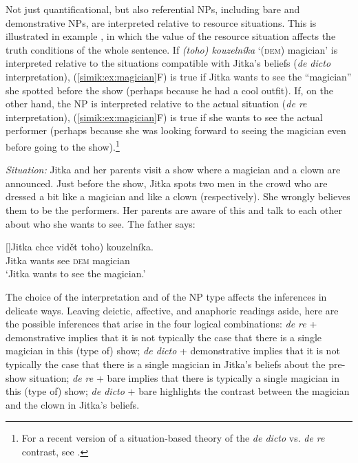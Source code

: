 \documentclass[output=paper,colorlinks,citecolor=brown,newtxmath]{langscibook}
\begin{document}
\noindent Not just quantificational, but also referential NPs, including bare and demonstrative NPs, are interpreted relative to resource situations. This is illustrated in example , in which the value of the resource situation affects the truth conditions of the whole sentence. If \textit{(toho) kouzelníka} `(\textsc{dem}) magician' is interpreted relative to the situations compatible with Jitka's beliefs (\textit{de dicto} interpretation), (\ref{simik:ex:magician}F) is true if Jitka wants to see the ``magician'' she spotted before the show (perhaps because he had a cool outfit). If, on the other hand, the NP is interpreted relative to the actual situation (\textit{de re} interpretation), (\ref{simik:ex:magician}F) is true if she wants to see the actual performer (perhaps because she was looking forward to seeing the magician even before going to the show).\footnote{For a recent version of a situation-based theory of the \textit{de dicto} vs. \textit{de re} contrast, see \citet{Keshet2008,Keshet2010}.}

\eanoraggedright \textit{Situation:} Jitka and her parents visit a show where a magician and a clown are announced. Just before the show, Jitka spots two men in the crowd who are dressed a bit like a magician and like a clown (respectively). She wrongly believes them to be the performers. Her parents are aware of this and talk to each other about who she wants to see. The father says:\label{simik:ex:magician}
\begin{xlist}
[]{\gll Jitka chce vidět \minsp{(} toho) kouzelníka.\\
Jitka wants see {} \textsc{dem} magician\\
\glt `Jitka wants to see the magician.'}
\end{xlist}
\z

\noindent The choice of the interpretation and of the NP type affects the inferences in delicate ways. Leaving deictic, affective, and anaphoric readings aside, here are the possible inferences that arise in the four logical combinations: \textit{de re} + demonstrative implies that it is not typically the case that there is a single magician in this (type of) show; \textit{de dicto} + demonstrative implies that it is not typically the case that there is a single magician in Jitka's beliefs about the pre-show situation; \textit{de re} + bare implies that there is typically a single magician in this (type of) show; \textit{de dicto} + bare highlights the contrast between the magician and the clown in Jitka's beliefs.
\end{document}
